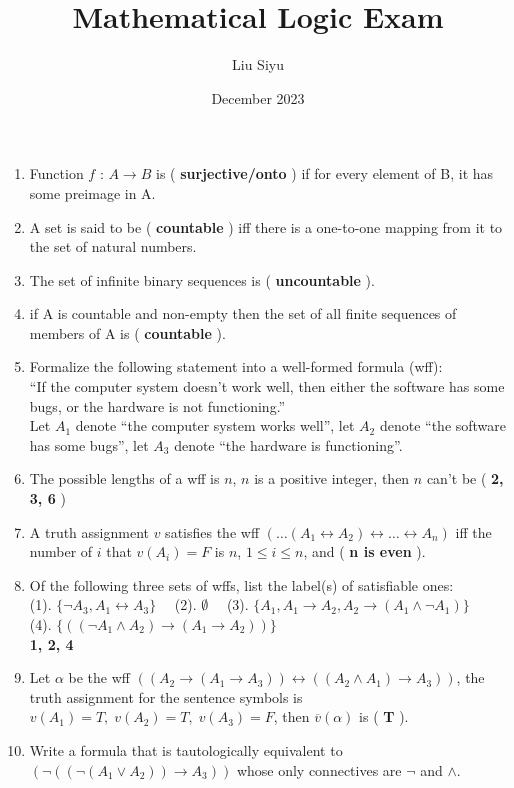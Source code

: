 \documentclass{article}
\title{Mathematical Logic Exam}
\author{Liu Siyu}
\date{December 2023}
\begin{document}
\maketitle

\begin{enumerate}
    \item Function $f$ : $A \rightarrow B$ is ( \textbf{surjective/onto} ) if for every element of B, 
        it has some preimage in A.
    \item A set is said to be ( \textbf{countable} ) iff there is a one-to-one mapping 
        from it to the set of natural numbers. 
    \item The set of infinite binary sequences is ( \textbf{uncountable} ).
    \item if A is countable and non-empty then the set of all finite
        sequences of members of A is ( \textbf{countable} ).    
    \item Formalize the following statement into a well-formed formula (wff): \\
        ``If the computer system doesn't work well, then either the software has some bugs, or the hardware is not functioning.'' \\
        Let $A_1$ denote ``the computer system works well'', let $A_2$ denote ``the software has some bugs'', 
        let $A_3$ denote ``the hardware is functioning''. \\
    \item The possible lengths of a wff is $n$, $n$ is a positive integer, then $n$ can't be 
        ( \textbf{2, 3, 6} )
    \item A truth assignment $v$ satisfies the wff $(\dots (A_1 \leftrightarrow A_2)\leftrightarrow \dots \leftrightarrow A_n)$
        iff the number of $i$ that $v(A_i) = F$ is $n$, $1 \leq i \leq n$, and ( \textbf{ n is even} ).
    \item Of the following three sets of wffs, list the label(s) of satisfiable ones: \\
        (1). $\{\lnot A_3, A_1 \leftrightarrow A_3\} \quad$ (2). $\emptyset  \quad$ 
        (3). $\{A_1, A_1\rightarrow A_2, A_2\rightarrow (A_1 \land \lnot A_1)\}$ \\
        (4). $\{((\lnot A_1 \land A_2)\rightarrow (A_1 \rightarrow A_2))\}$ \\
        \textbf{1, 2, 4}
    \item Let $\alpha$ be the wff $((A_2\rightarrow (A_1\rightarrow A_3)) \leftrightarrow ((A_2 \land A_1)\rightarrow A_3))$,
        the truth assignment for the sentence symbols is $v(A_1)=T,\; v(A_2)=T,\; v(A_3)=F$, then 
        $\overline{v}(\alpha)$ is ( \textbf{T} ).
    \item Write a formula that is tautologically equivalent to $(\lnot((\lnot (A_1 \lor A_2)) \rightarrow A_3))$
        whose only connectives are $\lnot$ and $\land$. \\
\end{enumerate}
\end{document}
